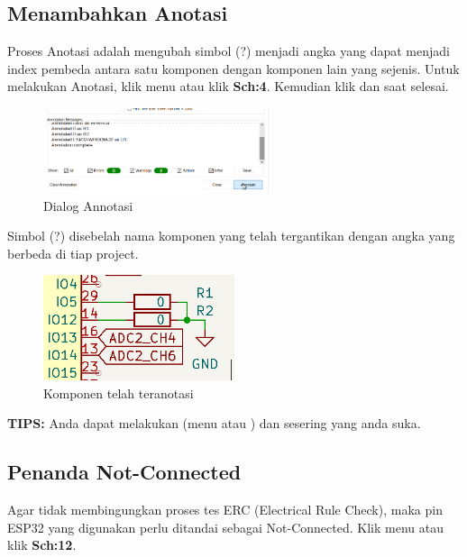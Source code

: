 \documentclass[12pt]{book}
\begin{document}
	\subsection{Menambahkan Anotasi}

	Proses Anotasi adalah mengubah simbol (?) menjadi angka yang dapat menjadi index pembeda antara
	satu komponen dengan komponen lain yang sejenis.
	Untuk melakukan Anotasi, klik menu  atau klik \textbf{Sch:4}.
	Kemudian klik  dan  saat selesai.

	\begin{figure}[!ht]
		\centering
		\includegraphics[width=0.6\textwidth]{images/sch/sch_15}
		\caption{Dialog Annotasi}
	\end{figure}

	Simbol (?) disebelah nama komponen yang telah tergantikan dengan angka yang berbeda di tiap project.

	\begin{figure}[!ht]
		\centering
		\includegraphics[width=0.5\textwidth]{images/sch/sch_16}
		\caption{Komponen telah teranotasi}
	\end{figure}

	\textbf{TIPS:} Anda dapat melakukan  (menu  atau ) dan  sesering yang anda suka.

	\newpage
	\subsection{Penanda Not-Connected}

	Agar tidak membingungkan proses tes ERC (Electrical Rule Check), maka pin ESP32 yang digunakan perlu ditandai sebagai Not-Connected.
	Klik menu  atau klik \textbf{Sch:12}.\\
\end{document}
